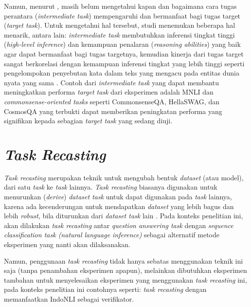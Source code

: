 Namun, menurut \citet{pruksachatkun-etal-2020-intermediate}, masih belum mengetahui kapan dan bagaimana cara tugas perantara (\emph{intermediate task}) mempengaruhi dan bermanfaat bagi tugas target (\emph{target task}). Untuk mengetahui hal tersebut, studi \citet{pruksachatkun-etal-2020-intermediate} menemukan beberapa hal menarik, antara lain: \emph{intermediate task} membutuhkan inferensi tingkat tinggi (\emph{high-level inference}) dan kemampuan penalaran (\emph{reasoning abilities}) yang baik agar dapat bermanfaat bagi tugas targetnya, kemudian kinerja dari tugas target sangat berkorelasi dengan kemampuan inferensi tingkat yang lebih tinggi seperti pengelompokan penyebutan kata dalam teks yang mengacu pada entitas dunia nyata yang sama \citep{coference-resolution}. Contoh dari \emph{intermediate task} yang dapat membantu meningkatkan performa \emph{target task} dari eksperimen \citeauthor{pruksachatkun-etal-2020-intermediate} adalah MNLI dan \emph{commonsense-oriented tasks} seperti CommonsenseQA, HellaSWAG, dan CosmosQA yang terbukti dapat memberikan peningkatan performa yang signifikan kepada sebagian \emph{target task} yang sedang diuji.

\section{\emph{Task Recasting}}
\emph{Task recasting} merupakan teknik untuk mengubah bentuk \emph{dataset} (atau model), dari satu \emph{task} ke \emph{task} lainnya. \emph{Task recasting} biasanya digunakan untuk menurunkan (\emph{derive}) \emph{dataset task} untuk dapat digunakan pada \emph{task} lainnya, karena ada kecenderungan untuk mendapatkan \emph{dataset} yang lebih bagus dan lebih \emph{robust}, bila diturunkan dari \emph{dataset task} lain \citep{DBLP:journals/corr/abs-1809-02922}. Pada konteks penelitian ini, akan dilakukan \emph{task recasting} antar \emph{question answering task} dengan \emph{sequence classification task (natural language inference)} sebagai alternatif metode eksperimen yang nanti akan dilaksanakan.

Namun, penggunaan \emph{task recasting} tidak hanya sebatas menggunakan teknik ini saja (tanpa penambahan eksperimen apapun), melainkan dibutuhkan eksperimen tambahan untuk menyelesaikan eksperimen yang menggunakan \emph{task recasting} ini, pada konteks penelitian ini contohnya seperti: \emph{task recasting} dengan memanfaatkan IndoNLI sebagai verifikator.

